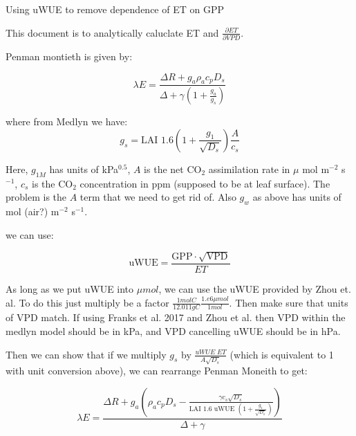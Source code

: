
\usepackage{graphics, graphicx}
\graphicspath{ {./} } %


\begin{center}
\large{Using uWUE to remove dependence of ET on GPP}\end{center}

\bigskip

This document is to analytically caluclate ET and $\frac{\partial ET} {\partial VPD}$.

Penman montieth is given by:

\begin{equation}
  \lambda E = \frac{\Delta R + g_a \rho_a c_p D_{s}}{\Delta + \gamma(1 + \frac{g_a}{g_s})}
\end{equation}

where from Medlyn we have:
\begin{equation}
  g_s = \text{LAI } 1.6 \left(1 + \frac{g_1}{\sqrt{D_{s}}}\right) \frac{A}{c_s}
\end{equation}

Here, $g_{1M}$ has units of kPa$^{0.5}$, $A$ is the net CO$_2$ assimilation rate in $\mu$ mol m$^{-2}$ s$^{-1}$, $c_s$ is the CO$_2$ concentration in ppm (supposed to be at leaf surface). The problem is the $A$ term that we need to get rid of. Also $g_w$ as above has units of mol (air?) m$^{-2}$ s$^{-1}$. 

we can use:

\begin{equation}
  \text{uWUE} = \frac{\text{GPP} \cdot \sqrt{\text{VPD}}}{ET}
\end{equation}

As long as we put uWUE into $\mu mol$, we can use the uWUE provided by Zhou et. al. To do this just multiply be a factor $ \frac{1 mol C}{12.011 g C} \frac{1.e6 \mu mol}{1 mol}$. Then make sure that units of VPD match. If using Franks et al. 2017 and Zhou et al. then VPD within the medlyn model should be in kPa, and VPD cancelling uWUE should be in hPa.

Then we can show that if we multiply $g_s$ by $\frac{ uWUE \; ET}{A \sqrt{D_s}}$ (which is equivalent to 1 with unit conversion above), we can rearrange Penman Moneith to get:

\begin{equation}
  \lambda E = \frac{\Delta R + g_a \left( \rho_a c_p D_{s} - \frac{\gamma c_s \sqrt{D_s}}{\text{LAI }1.6 \text{ uWUE } (1 + \frac{g_1}{\sqrt{D_s}})} \right) }{ \Delta + \gamma}
\end{equation}

